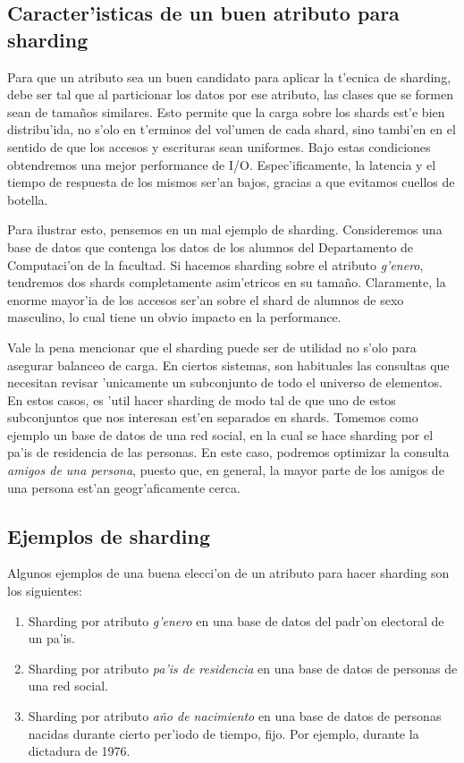 \subsection{Caracter'isticas de un buen atributo para sharding}

Para que un atributo sea un buen candidato para aplicar la t'ecnica de sharding, debe ser tal que al particionar los datos por ese atributo, las clases que se formen sean de tama\~nos similares. Esto permite que la carga sobre los shards est'e bien distribu'ida, no s'olo en t'erminos del vol'umen de cada shard, sino tambi'en en el sentido de que los accesos y escrituras sean uniformes. Bajo estas condiciones obtendremos una mejor performance de I/O. Espec'ificamente, la latencia y el tiempo de respuesta de los mismos ser'an bajos, gracias a que evitamos cuellos de botella.

Para ilustrar esto, pensemos en un mal ejemplo de sharding. Consideremos una base de datos que contenga los datos de los alumnos del Departamento de Computaci'on de la facultad. Si hacemos sharding sobre el atributo \emph{g'enero}, tendremos dos shards completamente asim'etricos en su tama\~no. Claramente, la enorme mayor'ia de los accesos ser'an sobre el shard de alumnos de sexo masculino, lo cual tiene un obvio impacto en la performance.

Vale la pena mencionar que el sharding puede ser de utilidad no s'olo para asegurar balanceo de carga. En ciertos sistemas, son habituales las consultas que necesitan revisar 'unicamente un subconjunto de todo el universo de elementos. En estos casos, es 'util hacer sharding de modo tal de que uno de estos subconjuntos que nos interesan est'en separados en shards. Tomemos como ejemplo un base de datos de una red social, en la cual se hace sharding por el pa'is de residencia de las personas. En este caso, podremos optimizar la consulta \textit{amigos de una persona}, puesto que, en general, la mayor parte de los amigos de una persona est'an geogr'aficamente cerca.

\subsection{Ejemplos de sharding}

Algunos ejemplos de una buena elecci'on de un atributo para hacer sharding son los siguientes:

\begin{enumerate}
	\item Sharding por atributo \emph{g'enero} en una base de datos del padr'on electoral de un pa'is.
	\item Sharding por atributo \emph{pa'is de residencia} en una base de datos de personas de una red social.
	\item Sharding por atributo \emph{a\~no de nacimiento} en una base de datos de personas nacidas durante cierto per'iodo de tiempo, fijo. Por ejemplo, durante la dictadura de 1976.
\end{enumerate}

